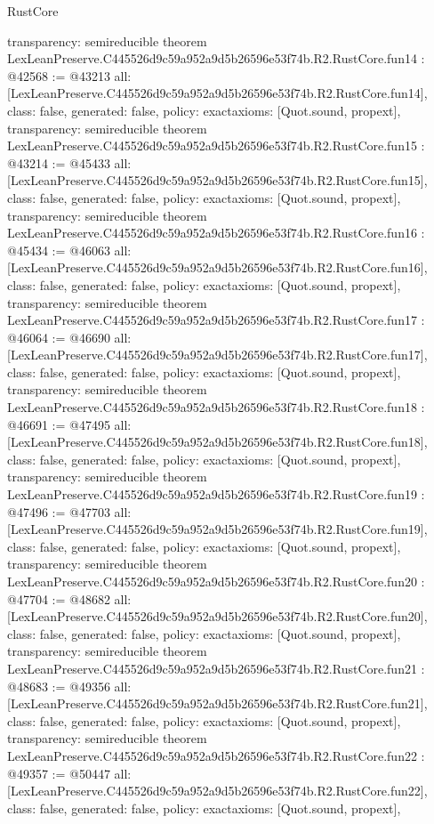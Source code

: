 \begin{lexlean}{RustCore}
\begin{coremodule}
{  transparency: semireducible
}
theorem LexLeanPreserve.C445526d9c59a952a9d5b26596e53f74b.R2.RustCore.fun14 : @42568 := @43213 {
  all: [LexLeanPreserve.C445526d9c59a952a9d5b26596e53f74b.R2.RustCore.fun14],
  class: false,
  generated: false,
  policy: exact{axioms: [Quot.sound, propext]},
  transparency: semireducible
}
theorem LexLeanPreserve.C445526d9c59a952a9d5b26596e53f74b.R2.RustCore.fun15 : @43214 := @45433 {
  all: [LexLeanPreserve.C445526d9c59a952a9d5b26596e53f74b.R2.RustCore.fun15],
  class: false,
  generated: false,
  policy: exact{axioms: [Quot.sound, propext]},
  transparency: semireducible
}
theorem LexLeanPreserve.C445526d9c59a952a9d5b26596e53f74b.R2.RustCore.fun16 : @45434 := @46063 {
  all: [LexLeanPreserve.C445526d9c59a952a9d5b26596e53f74b.R2.RustCore.fun16],
  class: false,
  generated: false,
  policy: exact{axioms: [Quot.sound, propext]},
  transparency: semireducible
}
theorem LexLeanPreserve.C445526d9c59a952a9d5b26596e53f74b.R2.RustCore.fun17 : @46064 := @46690 {
  all: [LexLeanPreserve.C445526d9c59a952a9d5b26596e53f74b.R2.RustCore.fun17],
  class: false,
  generated: false,
  policy: exact{axioms: [Quot.sound, propext]},
  transparency: semireducible
}
theorem LexLeanPreserve.C445526d9c59a952a9d5b26596e53f74b.R2.RustCore.fun18 : @46691 := @47495 {
  all: [LexLeanPreserve.C445526d9c59a952a9d5b26596e53f74b.R2.RustCore.fun18],
  class: false,
  generated: false,
  policy: exact{axioms: [Quot.sound, propext]},
  transparency: semireducible
}
theorem LexLeanPreserve.C445526d9c59a952a9d5b26596e53f74b.R2.RustCore.fun19 : @47496 := @47703 {
  all: [LexLeanPreserve.C445526d9c59a952a9d5b26596e53f74b.R2.RustCore.fun19],
  class: false,
  generated: false,
  policy: exact{axioms: [Quot.sound, propext]},
  transparency: semireducible
}
theorem LexLeanPreserve.C445526d9c59a952a9d5b26596e53f74b.R2.RustCore.fun20 : @47704 := @48682 {
  all: [LexLeanPreserve.C445526d9c59a952a9d5b26596e53f74b.R2.RustCore.fun20],
  class: false,
  generated: false,
  policy: exact{axioms: [Quot.sound, propext]},
  transparency: semireducible
}
theorem LexLeanPreserve.C445526d9c59a952a9d5b26596e53f74b.R2.RustCore.fun21 : @48683 := @49356 {
  all: [LexLeanPreserve.C445526d9c59a952a9d5b26596e53f74b.R2.RustCore.fun21],
  class: false,
  generated: false,
  policy: exact{axioms: [Quot.sound, propext]},
  transparency: semireducible
}
theorem LexLeanPreserve.C445526d9c59a952a9d5b26596e53f74b.R2.RustCore.fun22 : @49357 := @50447 {
  all: [LexLeanPreserve.C445526d9c59a952a9d5b26596e53f74b.R2.RustCore.fun22],
  class: false,
  generated: false,
  policy: exact{axioms: [Quot.sound, propext]},
}
\end{coremodule}
\end{lexlean}
